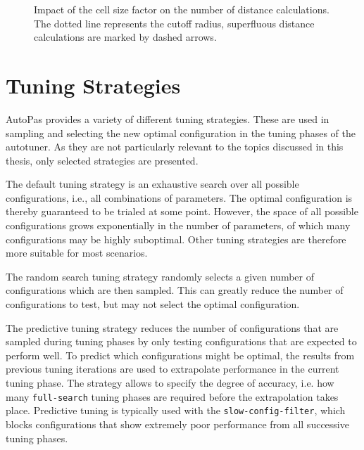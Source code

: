 \begin{figure}
\begin{subfigure}{0.3\textwidth}
	\end{subfigure}
	\caption{Impact of the cell size factor on the number of distance calculations. The dotted line represents the cutoff radius, superfluous distance calculations are marked by dashed arrows.}
	\label{fig:lc_csf}
\end{figure}



\section{Tuning Strategies}
\label{sec:tuning_strategies}

AutoPas provides a variety of different tuning strategies. These are used in sampling and selecting the new optimal configuration in the tuning phases of the autotuner. As they are not particularly relevant to the topics discussed in this thesis, only selected strategies are presented.
\begin{description}[leftmargin=!,labelwidth=\widthof{\textbf{PredictiveTuning }}]
	\item[\textbf{FullSearch}] The default tuning strategy is an exhaustive search over all possible configurations, i.e., all combinations of parameters. The optimal configuration is thereby guaranteed to be trialed at some point. However, the space of all possible configurations grows exponentially in the number of parameters, of which many configurations may be highly suboptimal. Other tuning strategies are therefore more suitable for most scenarios.
	\item[\textbf{RandomSearch}] The random search tuning strategy randomly selects a given number of configurations which are then sampled. This can greatly reduce the number of configurations to test, but may not select the optimal configuration.
	\item[\textbf{PredictiveTuning}] The predictive tuning strategy reduces the number of configurations that are sampled during tuning phases by only testing configurations that are expected to perform well. To predict which configurations might be optimal, the results from previous tuning iterations are used to extrapolate performance in the current tuning phase. The strategy allows to specify the degree of accuracy, i.e. how many \texttt{full-search} tuning phases are required before the extrapolation takes place. Predictive tuning is typically used with the \texttt{slow-config-filter}, which blocks configurations that show extremely poor performance from all successive tuning phases. \cite{Pelloth2020}
\end{description}


